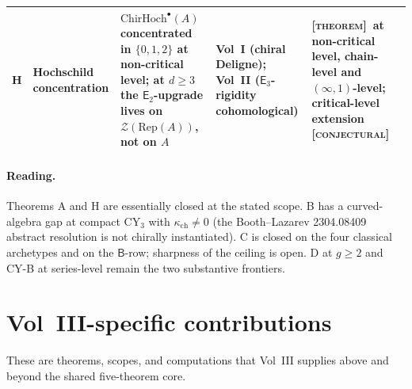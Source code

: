 \documentclass[11pt]{article}
\theoremstyle{definition}
\theoremstyle{remark}
\providecommand{\cZ}{\mathcal{Z}}
\providecommand{\ChirHoch}{\mathrm{ChirHoch}}
\providecommand{\Etwo}{\mathsf{E}_2}
\providecommand{\Ethree}{\mathsf{E}_3}
\providecommand{\kch}{\kappa_{\mathrm{ch}}}
\providecommand{\Rep}{\mathrm{Rep}}
\providecommand{\ClaimStatusTheorem}{\textsc{[theorem]}}
\providecommand{\ClaimStatusConjectured}{\textsc{[conjectural]}}
\begin{document}
\begin{longtable}{@{}p{0.6cm}p{2.5cm}p{5.0cm}p{3.0cm}p{3.3cm}@{}}
H & Hochschild concentration
& $\ChirHoch^\bullet(A)$ concentrated in $\{0,1,2\}$ at non-critical
level; at $d\geq 3$ the $\Etwo$-upgrade lives on $\cZ(\Rep(A))$, not
on $A$
& Vol~I (chiral Deligne); Vol~II ($\Ethree$-rigidity cohomological)
& \ClaimStatusTheorem\ at non-critical level, chain-level and
$(\infty,1)$-level; critical-level extension
\ClaimStatusConjectured\
\\
\bottomrule
\end{longtable}

\paragraph{Reading.} Theorems A and H are essentially closed at the
stated scope. B has a curved-algebra gap at compact CY$_3$ with
$\kch\neq 0$ (the Booth--Lazarev 2304.08409 abstract resolution is
not chirally instantiated). C is closed on the four classical archetypes
and on the $\mathsf{B}$-row; sharpness of the ceiling is open. D at
$g\geq 2$ and CY-B at series-level remain the two substantive
frontiers.

\section{Vol~III-specific contributions}

These are theorems, scopes, and computations that Vol~III supplies
above and beyond the shared five-theorem core.
\end{document}
